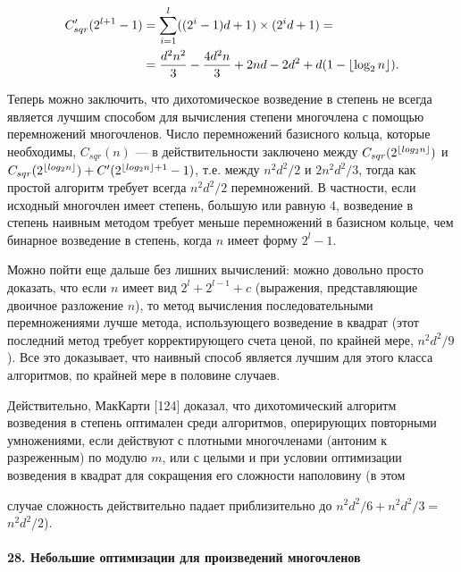 \documentclass{../../template/mai_book}
\DeclarePairedDelimiter{\floor}{\lfloor}{\rfloor}
\begin{document}
\begin{equation*}
	\begin{split}
	C_{sqr}'(2^{l + 1} - 1) &= \sum_{i = 1}^l ((2^i - 1)d + 1) \times (2^i d + 1) =
	\\
	&= \frac{d^2 n^2}{3} - \frac{4d^2 n}{3} + 2nd -2d^2 + d(1 - \floor{\log_2 n} ).
	\end{split}
\end{equation*}

\noindent
Теперь можно заключить, что дихотомическое возведение в степень не всегда является лучшим способом для вычисления степени многочлена с помощью перемножений многочленов. Число перемножений базисного кольца, которые необходимы, $C_{sqr}(n)$ — в действительности заключено между $C_{sqr}(2^{\floor{log_2 n}})$ и $C_{sqr}(2^{\floor{log_2 n}}) + C'(2^{\floor{log_2 n} + 1} - 1)$, т.е. между $n^2 d^2 / 2$ и $2n^2 d^2 / 3$, тогда как простой алгоритм требует всегда $n^2 d^2 / 2$ перемножений. В частности, если исходный многочлен имеет степень, большую или равную 4, возведение в степень наивным методом  требует меньше перемножений в базисном кольце, чем бинарное возведение в степень, когда $n$ имеет форму $2^l - 1$. \newline


Можно пойти еще дальше без лишних вычислений: можно довольно просто доказать, что если $n$ имеет вид $2^l + 2^{l - 1} + c$ (выражения, представляющие двоичное разложение $n$), то метод вычисления последовательными перемножениями лучше метода, использующего возведение в квадрат (этот последний метод требует корректирующего счета ценой, по крайней мере, $n^2 d^2 / 9$). Все это доказывает, что наивный способ является лучшим для этого класса алгоритмов, по крайней мере в половине случаев. \newline

Действительно, МакКарти [124] доказал, что дихотомический алгоритм возведения в степень оптимален среди алгоритмов, оперирующих повторными умножениями, если действуют с плотными многочленами (антоним к разреженным) по модулю $m$, или с целыми и при условии оптимизации возведения в квадрат для сокращения его сложности наполовину (в этом

\newpage


\noindent
случае сложность действительно падает приблизительно до $n^2 d^2 / 6 + n^2 d^2 / 3 =$ \linebreak $n^2 d^2 / 2$).

\paragraph{28. Небольшие оптимизации для произведений многочленов}
\end{document}
